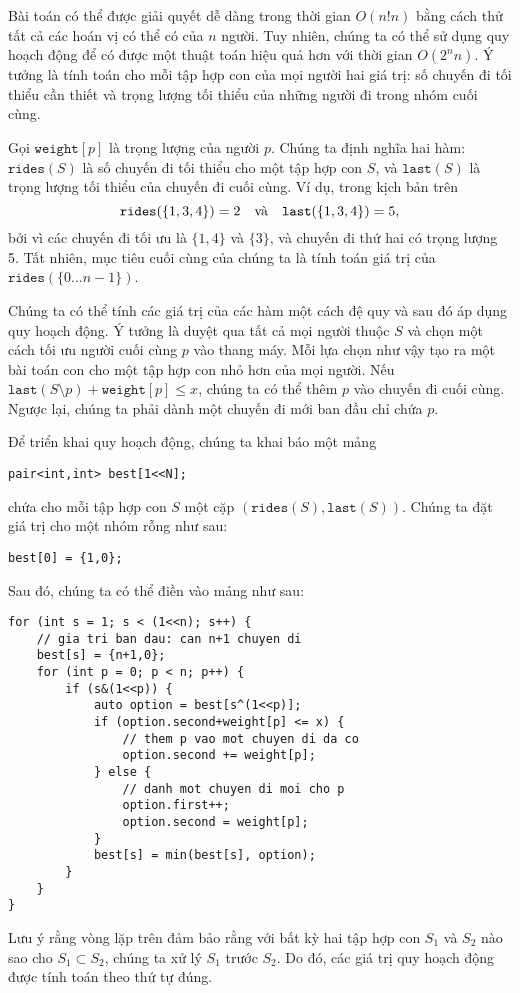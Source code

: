 Bài toán có thể được giải quyết dễ dàng trong thời gian $O(n! n)$
bằng cách thử tất cả các hoán vị có thể có của $n$ người.
Tuy nhiên, chúng ta có thể sử dụng quy hoạch động để có được
một thuật toán hiệu quả hơn với thời gian $O(2^n n)$.
Ý tưởng là tính toán cho mỗi tập hợp con của mọi người
hai giá trị: số chuyến đi tối thiểu cần thiết và
trọng lượng tối thiểu của những người đi trong nhóm cuối cùng.

Gọi $\texttt{weight}[p]$ là trọng lượng của
người $p$.
Chúng ta định nghĩa hai hàm:
$\texttt{rides}(S)$ là số chuyến đi tối thiểu
cho một tập hợp con $S$,
và $\texttt{last}(S)$ là trọng lượng tối thiểu
của chuyến đi cuối cùng.
Ví dụ, trong kịch bản trên
\[ \texttt{rides}(\{1,3,4\})=2 \hspace{10px} \textrm{và}
\hspace{10px} \texttt{last}(\{1,3,4\})=5,\]
bởi vì các chuyến đi tối ưu là $\{1,4\}$ và $\{3\}$,
và chuyến đi thứ hai có trọng lượng 5.
Tất nhiên, mục tiêu cuối cùng của chúng ta là tính toán giá trị
của $\texttt{rides}(\{0 \ldots n-1\})$.

Chúng ta có thể tính các giá trị
của các hàm một cách đệ quy và sau đó áp dụng
quy hoạch động.
Ý tưởng là duyệt qua tất cả mọi người
thuộc $S$ và chọn một cách tối ưu
người cuối cùng $p$ vào thang máy.
Mỗi lựa chọn như vậy tạo ra một bài toán con
cho một tập hợp con nhỏ hơn của mọi người.
Nếu $\texttt{last}(S \setminus p)+\texttt{weight}[p] \le x$,
chúng ta có thể thêm $p$ vào chuyến đi cuối cùng.
Ngược lại, chúng ta phải dành một chuyến đi mới
ban đầu chỉ chứa $p$.

Để triển khai quy hoạch động,
chúng ta khai báo một mảng
\begin{lstlisting}
pair<int,int> best[1<<N];
\end{lstlisting}
chứa cho mỗi tập hợp con $S$
một cặp $(\texttt{rides}(S),\texttt{last}(S))$.
Chúng ta đặt giá trị cho một nhóm rỗng như sau:
\begin{lstlisting}
best[0] = {1,0};
\end{lstlisting}
Sau đó, chúng ta có thể điền vào mảng như sau:

\begin{lstlisting}
for (int s = 1; s < (1<<n); s++) {
    // gia tri ban dau: can n+1 chuyen di
    best[s] = {n+1,0};
    for (int p = 0; p < n; p++) {
        if (s&(1<<p)) {
            auto option = best[s^(1<<p)];
            if (option.second+weight[p] <= x) {
                // them p vao mot chuyen di da co
                option.second += weight[p];
            } else {
                // danh mot chuyen di moi cho p
                option.first++;
                option.second = weight[p];
            }
            best[s] = min(best[s], option);
        }
    }
}
\end{lstlisting}
Lưu ý rằng vòng lặp trên đảm bảo rằng
với bất kỳ hai tập hợp con $S_1$ và $S_2$
nào sao cho $S_1 \subset S_2$, chúng ta xử lý $S_1$ trước $S_2$.
Do đó, các giá trị quy hoạch động được tính toán theo
thứ tự đúng.

